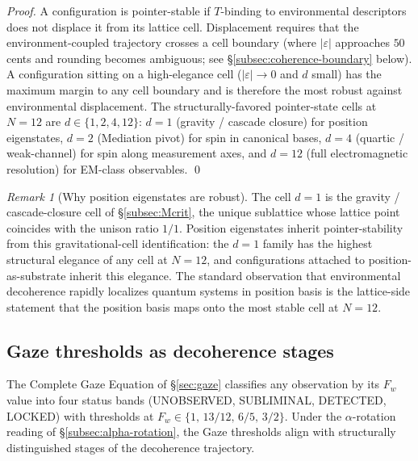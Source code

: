 \documentclass[11pt,a4paper]{article}
\theoremstyle{definition}
\theoremstyle{remark}
\newtheorem{remark}[theorem]{Remark}
\begin{document}
\begin{proof}
A configuration is pointer-stable if $T$-binding to environmental descriptors does not displace it from its lattice cell. Displacement requires that the environment-coupled trajectory crosses a cell boundary (where $|\varepsilon|$ approaches $50$ cents and rounding becomes ambiguous; see \S\ref{subsec:coherence-boundary} below). A configuration sitting on a high-elegance cell ($|\varepsilon| \to 0$ and $d$ small) has the maximum margin to any cell boundary and is therefore the most robust against environmental displacement. The structurally-favored pointer-state cells at $N = 12$ are $d \in \{1, 2, 4, 12\}$: $d=1$ (gravity / cascade closure) for position eigenstates, $d=2$ (Mediation pivot) for spin in canonical bases, $d=4$ (quartic / weak-channel) for spin along measurement axes, and $d=12$ (full electromagnetic resolution) for EM-class observables. \qed
\end{proof}

\begin{remark}[Why position eigenstates are robust]\label{rem:position-pointer}
The cell $d=1$ is the gravity / cascade-closure cell of \S\ref{subsec:Mcrit}, the unique sublattice whose lattice point coincides with the unison ratio $1/1$. Position eigenstates inherit pointer-stability from this gravitational-cell identification: the $d=1$ family has the highest structural elegance of any cell at $N=12$, and configurations attached to position-as-substrate inherit this elegance. The standard observation that environmental decoherence rapidly localizes quantum systems in position basis is the lattice-side statement that the position basis maps onto the most stable cell at $N = 12$.
\end{remark}

\subsection{Gaze thresholds as decoherence stages}\label{subsec:gaze-decoherence-stages}

The Complete Gaze Equation of \S\ref{sec:gaze} classifies any observation by its $F_{w}$ value into four status bands (UNOBSERVED, SUBLIMINAL, DETECTED, LOCKED) with thresholds at $F_{w} \in \{1,\,13/12,\,6/5,\,3/2\}$. Under the $\alpha$-rotation reading of \S\ref{subsec:alpha-rotation}, the Gaze thresholds align with structurally distinguished stages of the decoherence trajectory.
\end{document}
